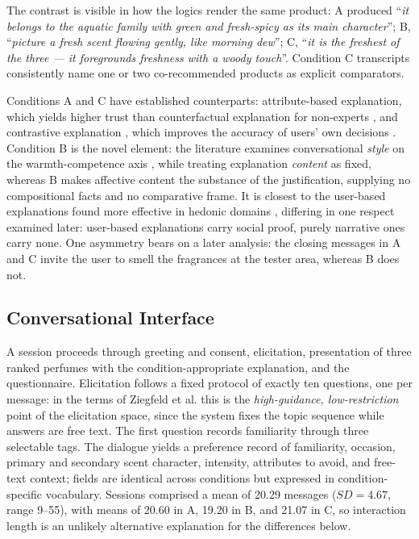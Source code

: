 \documentclass[conference]{IEEEtran}
\begin{document}
The contrast is visible in how the logics render the same product: A produced
``\textit{it belongs to the aquatic family with green and fresh-spicy as its main
character}''; B, ``\textit{picture a fresh scent flowing gently, like morning dew}''; C,
``\textit{it is the freshest of the three --- it foregrounds freshness with a woody
touch}''. Condition C transcripts consistently name one or two co-recommended products as
explicit comparators.

Conditions A and C have established counterparts: attribute-based explanation, which yields
higher trust than counterfactual explanation for non-experts \cite{brito2023}, and
contrastive explanation \cite{stepin2021}, which improves the accuracy of users' own
decisions \cite{celar2023}. Condition B is the novel element: the literature examines
conversational \textit{style} on the warmth-competence axis \cite{libaoku2024},
\cite{cheng2022} while treating explanation \textit{content} as fixed, whereas B makes
affective content the substance of the justification, supplying no compositional facts and
no comparative frame. It is closest to the user-based explanations found more effective in
hedonic domains \cite{chen2024}, differing in one respect examined later: user-based
explanations carry social proof, purely narrative ones carry none. One asymmetry bears on a
later analysis: the closing messages in A and C invite the user to smell the fragrances at
the tester area, whereas B does not.

\subsection{Conversational Interface}

A session proceeds through greeting and consent, elicitation, presentation of three ranked
perfumes with the condition-appropriate explanation, and the questionnaire. Elicitation
follows a fixed protocol of exactly ten questions, one per message: in the terms of
Ziegfeld et al. \cite{ziegfeld2025} this is the \textit{high-guidance, low-restriction}
point of the elicitation space, since the system fixes the topic sequence while answers are
free text. The first question records familiarity through three selectable tags. The
dialogue yields a preference record of familiarity, occasion, primary and secondary scent
character, intensity, attributes to avoid, and free-text context; fields are identical
across conditions but expressed in condition-specific vocabulary. Sessions comprised a mean
of 20.29 messages ($SD = 4.67$, range 9--55), with means of 20.60 in A, 19.20 in B, and
21.07 in C, so interaction length is an unlikely alternative explanation for the
differences below.
\end{document}
